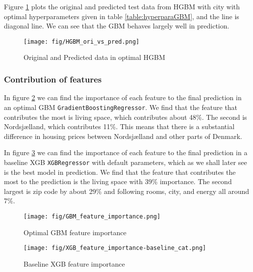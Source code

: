 \documentclass[12pt]{article} %
\begin{document}
{            Figure \ref{fig:HGBMoripred} plots the original and predicted test data from HGBM with city with optimal hyperparameters given in table \ref{table:hyperparaGBM}, and the line is diagonal line. We can see that the GBM behaves largely well in prediction.
            
            \begin{figure}[]
                \centering
                \texttt{[image: fig/HGBM\_ori\_vs\_pred.png]}
                \caption{Original and Predicted data in optimal HGBM}
                \label{fig:HGBMoripred}
            \end{figure}
            

                \subsubsection{Contribution of features}
                In figure \ref{fig:featurecontriGBM} we can find the importance of each feature to the final prediction in an optimal GBM \texttt{GradientBoostingRegressor}. We find that the feature that contributes the most is living space, which contributes about 48\%. The second is Nordsjælland, which contributes 11\%. This means that there is a substantial difference in housing prices between Nordsjælland and other parts of Denmark.\par
                
                In figure \ref{fig:featurecontriXGB} we can find the importance of each feature to the final prediction in a baseline XGB \texttt{XGBRegressor} with default parameters, which as we shall later see is the best model in prediction. We find that the feature that contributes the most to the prediction is the living space with 39\% importance. The second largest is zip code by about 29\% and following rooms, city, and energy all around 7\%.
                
            \begin{figure}[]
                \centering
                \texttt{[image: fig/GBM\_feature\_importance.png]}
                \caption{Optimal GBM feature importance}
                \label{fig:featurecontriGBM}
            \end{figure}
            
            \begin{figure}[]
                \centering
                \texttt{[image: fig/XGB\_feature\_importance-baseline\_cat.png]}
                \caption{Baseline XGB feature importance}
                \label{fig:featurecontriXGB}
            \end{figure}        
            
}
\end{document}
